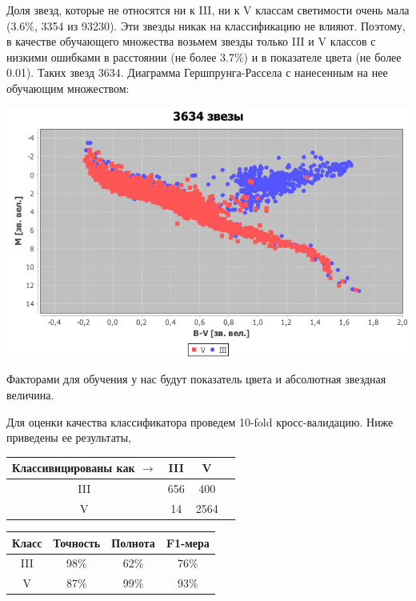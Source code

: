 \documentclass[14pt]{article}
\begin{document}
		Доля звезд, которые не относятся ни к III, ни к V классам светимости очень мала (3.6\%, 3354 из 93230). Эти звезды никак на классификацию не влияют. Поэтому, в качестве обучающего множества возьмем звезды только III и V классов с низкими ошибками в расстоянии (не более 3.7\%) и в показателе цвета (не более 0.01). Таких звезд $3634$. Диаграмма Гершпрунга-Рассела с нанесенным на нее обучающим множеством:
		\begin{center}
			\includegraphics[scale=0.4]{ml-learn.png}   
		\end{center}
        Факторами для обучения у нас будут показатель цвета и абсолютная звездная величина.
		
        Для оценки качества классификатора проведем 10-fold кросс-валидацию. Ниже приведены ее результаты, \\
                
        
        \begin{center}
            \begin{tabular} {| c | c | c | c |}
                \hline
                Классивицированы как $\rightarrow$   &    III   &    V    \\
                \hline
                III    &    656    &    400    \\		
                \hline
                V    &    14    &	2564    \\
                \hline
            \end{tabular}
            \begin{tabular} {| c | c | c | c |}
                \hline
                Класс    &    Точность   &    Полнота    &    F1-мера     \\
                \hline
                III    &    98\%    &    62\%    &    76\% \\		
                V	&	87\%		&	99\%		&	93\%		\\
                \hline
            \end{tabular}
        \end{center}
		 	
\end{document}
